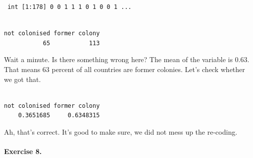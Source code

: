 \documentclass[]{article}
\newenvironment{Shaded}{\begin{snugshade}}{\end{snugshade}}
\newcommand{\KeywordTok}[1]{\textcolor[rgb]{0.13,0.29,0.53}{\textbf{#1}}}
\newcommand{\DataTypeTok}[1]{\textcolor[rgb]{0.13,0.29,0.53}{#1}}
\newcommand{\DecValTok}[1]{\textcolor[rgb]{0.00,0.00,0.81}{#1}}
\newcommand{\StringTok}[1]{\textcolor[rgb]{0.31,0.60,0.02}{#1}}
\newcommand{\CommentTok}[1]{\textcolor[rgb]{0.56,0.35,0.01}{\textit{#1}}}
\newcommand{\OperatorTok}[1]{\textcolor[rgb]{0.81,0.36,0.00}{\textbf{#1}}}
\newcommand{\NormalTok}[1]{#1}
\let\oldparagraph\paragraph
\renewcommand{\paragraph}[1]{\oldparagraph{#1}\mbox{}}
\theoremstyle{definition}
\theoremstyle{definition}
\theoremstyle{definition}
\theoremstyle{remark}
\begin{document}
\begin{verbatim}
 int [1:178] 0 0 1 1 1 0 1 0 0 1 ...
\end{verbatim}

\begin{Shaded}
\end{Shaded}

\begin{verbatim}

not colonised former colony 
           65           113 
\end{verbatim}

Wait a minute. Is there something wrong here? The mean of the variable
is 0.63. That means 63 percent of all countries are former colonies.
Let's check whether we got that.

\begin{Shaded}
\end{Shaded}

\begin{verbatim}

not colonised former colony 
    0.3651685     0.6348315 
\end{verbatim}

Ah, that's correct. It's good to make sure, we did not mess up the
re-coding.

\paragraph{Exercise 8.}\label{exercise-8.}
\end{document}
